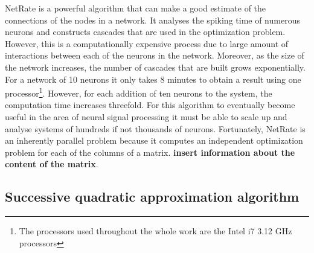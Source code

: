 \documentclass[11pt]{article}
\begin{document}
NetRate is a powerful algorithm that can make a good estimate of the connections of the nodes in a network. It analyses the spiking time of numerous neurons and constructs cascades that are used in the optimization problem. However, this is a computationally expensive process due to large amount of interactions between each of the neurons in the network. Moreover, as the size of the network increases, the number of cascades that are built grows exponentially. For a network of 10 neurons it only takes 8 minutes to obtain a result using one processor\footnote{The processors used throughout the whole work are the Intel i7 3.12 GHz processors}. However, for each addition of ten neurons to the system, the computation time increases threefold. 
For this algorithm to eventually become useful in the area of neural signal processing it must be able to scale up and analyse systems of hundreds if not thousands of neurons. Fortunately, NetRate is an inherently parallel problem because it computes an independent optimization problem for each of the columns of a matrix. \textbf{insert information about the content of the matrix}.

\subsection{Successive quadratic approximation algorithm}



\newpage
\printbibliography 
\end{document}

